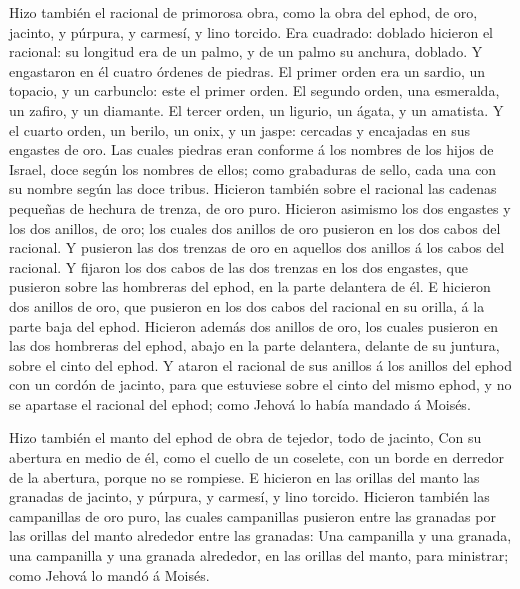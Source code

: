  Hizo también el racional de primorosa obra, como la obra
del ephod, de oro, jacinto, y púrpura, y carmesí, y lino torcido.
 Era cuadrado: doblado hicieron el racional: su longitud era
de un palmo, y de un palmo su anchura, doblado.  Y
engastaron en él cuatro órdenes de piedras. El primer orden era un
sardio, un topacio, y un carbunclo: este el primer orden. 
El segundo orden, una esmeralda, un zafiro, y un diamante. 
El tercer orden, un ligurio, un ágata, y un amatista.  Y el
cuarto orden, un berilo, un onix, y un jaspe: cercadas y encajadas en
sus engastes de oro.  Las cuales piedras eran conforme á
los nombres de los hijos de Israel, doce según los nombres de ellos;
como grabaduras de sello, cada una con su nombre según las doce tribus.
 Hicieron también sobre el racional las cadenas pequeñas de
hechura de trenza, de oro puro.  Hicieron asimismo los dos
engastes y los dos anillos, de oro; los cuales dos anillos de oro
pusieron en los dos cabos del racional.  Y pusieron las dos
trenzas de oro en aquellos dos anillos á los cabos del racional.
 Y fijaron los dos cabos de las dos trenzas en los dos
engastes, que pusieron sobre las hombreras del ephod, en la parte
delantera de él.  E hicieron dos anillos de oro, que
pusieron en los dos cabos del racional en su orilla, á la parte baja del
ephod.  Hicieron además dos anillos de oro, los cuales
pusieron en las dos hombreras del ephod, abajo en la parte delantera,
delante de su juntura, sobre el cinto del ephod.  Y ataron
el racional de sus anillos á los anillos del ephod con un cordón de
jacinto, para que estuviese sobre el cinto del mismo ephod, y no se
apartase el racional del ephod; como Jehová lo había mandado á Moisés.

 Hizo también el manto del ephod de obra de tejedor, todo
de jacinto,  Con su abertura en medio de él, como el cuello
de un coselete, con un borde en derredor de la abertura, porque no se
rompiese.  E hicieron en las orillas del manto las granadas
de jacinto, y púrpura, y carmesí, y lino torcido.  Hicieron
también las campanillas de oro puro, las cuales campanillas pusieron
entre las granadas por las orillas del manto alrededor entre las
granadas:  Una campanilla y una granada, una campanilla y
una granada alrededor, en las orillas del manto, para ministrar; como
Jehová lo mandó á Moisés.

